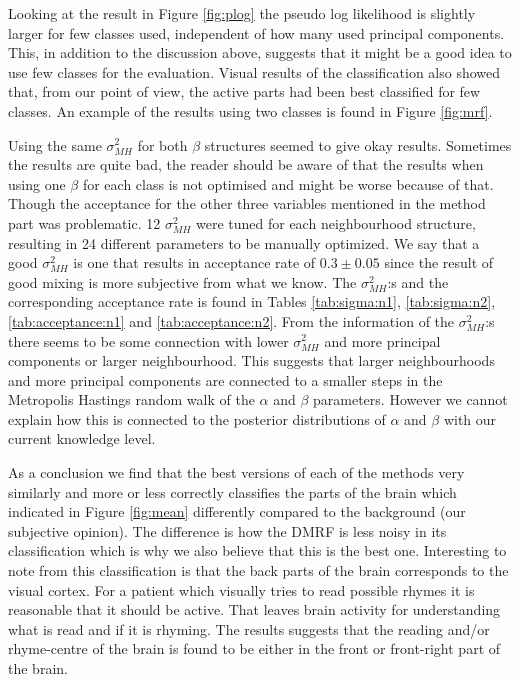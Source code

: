 \documentclass[a4paper,english]{article}
\begin{document}
Looking at the result in Figure \ref{fig:plog} the pseudo log likelihood is slightly larger for few classes used, independent of how many used principal components. This, in addition to the discussion above, suggests that it might be a good idea to use few classes for the evaluation. Visual results of the classification also showed that, from our point of view, the active parts had been best classified for few classes. An example of the results using two classes is found in Figure \ref{fig:mrf}.

Using the same $\sigma_{MH}^2$ for both $\beta$ structures seemed to give okay results. Sometimes the results are quite bad, the reader should be aware of that the results when using one $\beta$ for each class is not optimised and might be worse because of that. Though the acceptance for the other three variables mentioned in the method part was problematic. 12 $\sigma_{MH}^2$ were tuned for each neighbourhood structure, resulting in 24 different parameters to be manually optimized.
We say that a good $\sigma_{MH}^2$ is one that results in acceptance rate of $0.3 \pm 0.05$ since the result of good mixing is more subjective from what we know.
The $\sigma_{MH}^2$:s and the corresponding acceptance rate is found in Tables \ref{tab:sigma:n1}, \ref{tab:sigma:n2}, \ref{tab:acceptance:n1} and \ref{tab:acceptance:n2}.
From the information of the $\sigma_{MH}^2$:s there seems to be some connection with lower $\sigma_{MH}^2$ and more principal components or larger neighbourhood.
This suggests that larger neighbourhoods and more principal components are connected to a smaller steps in the Metropolis Hastings random walk of the $\alpha$ and $\beta$ parameters.
However we cannot explain how this is connected to the posterior distributions of $\alpha$ and $\beta$ with our current knowledge level.

As a conclusion we find that the best versions of each of the methods very similarly and more or less correctly classifies the parts of the brain which indicated in Figure \ref{fig:mean} differently compared to the background (our subjective opinion).
The difference is how the DMRF is less noisy in its classification which is why we also believe that this is the best one.
Interesting to note from this classification is that the back parts of the brain corresponds to the visual cortex.
For a patient which visually tries to read possible rhymes it is reasonable that it should be active.
That leaves brain activity for understanding what is read and if it is rhyming.
The results suggests that the reading and/or rhyme-centre of the brain is found to be either in the front or front-right part of the brain.
\end{document}
